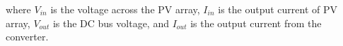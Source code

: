 \documentclass[review]{elsarticle}
\begin{document}
\noindent where $ V_{in} $ is the voltage across the PV array, $ I_{in} $ is the output current of PV array, $ V_{out} $ is the  DC bus voltage, and $ I_{out} $ is the output current from the converter.

% 
%
%
%
% 
%  
% 
 
\end{document}
